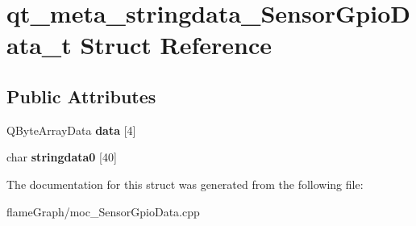 \hypertarget{structqt__meta__stringdata__SensorGpioData__t}{}\section{qt\+\_\+meta\+\_\+stringdata\+\_\+\+Sensor\+Gpio\+Data\+\_\+t Struct Reference}
\label{structqt__meta__stringdata__SensorGpioData__t}
\subsection*{Public Attributes}
\begin{DoxyCompactItemize}
\item 
\mbox{\label{structqt__meta__stringdata__SensorGpioData__t_a1d4d4c42140527f4fa9ed48e8060d3e0}} 
Q\+Byte\+Array\+Data {\bfseries data} \mbox{[}4\mbox{]}
\item 
\mbox{\label{structqt__meta__stringdata__SensorGpioData__t_af04760b7eeb08ad57ed6387bb0a4cc87}} 
char {\bfseries stringdata0} \mbox{[}40\mbox{]}
\end{DoxyCompactItemize}


The documentation for this struct was generated from the following file\+:\begin{DoxyCompactItemize}
\item 
flame\+Graph/moc\+\_\+\+Sensor\+Gpio\+Data.\+cpp\end{DoxyCompactItemize}
